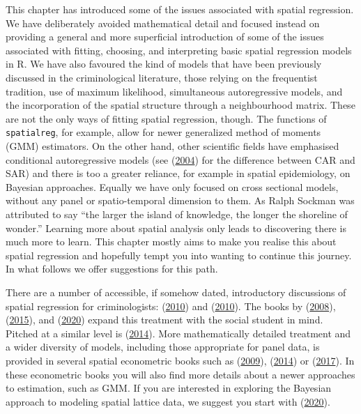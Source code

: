 \documentclass[
  krantz2]{krantz}
\begin{document}
This chapter has introduced some of the issues associated with spatial regression. We have deliberately avoided mathematical detail and focused instead on providing a general and more superficial introduction of some of the issues associated with fitting, choosing, and interpreting basic spatial regression models in R. We have also favoured the kind of models that have been previously discussed in the criminological literature, those relying on the frequentist tradition, use of maximum likelihood, simultaneous autoregressive models, and the incorporation of the spatial structure through a neighbourhood matrix. These are not the only ways of fitting spatial regression, though. The functions of \texttt{spatialreg}, for example, allow for newer generalized method of moments (GMM) estimators. On the other hand, other scientific fields have emphasised conditional autoregressive models (see (\protect\hyperlink{ref-Wall_2004}{2004}) for the difference between CAR and SAR) and there is too a greater reliance, for example in spatial epidemiology, on Bayesian approaches. Equally we have only focused on cross sectional models, without any panel or spatio-temporal dimension to them. As Ralph Sockman was attributed to say ``the larger the island of knowledge, the longer the shoreline of wonder.'' Learning more about spatial analysis only leads to discovering there is much more to learn. This chapter mostly aims to make you realise this about spatial regression and hopefully tempt you into wanting to continue this journey. In what follows we offer suggestions for this path.

There are a number of accessible, if somehow dated, introductory discussions of spatial regression for criminologists: (\protect\hyperlink{ref-Tita_2010}{2010}) and (\protect\hyperlink{ref-Bernasco_2010}{2010}). The books by (\protect\hyperlink{ref-Ward_2008}{2008}), (\protect\hyperlink{ref-Darmofal_2015}{2015}), and (\protect\hyperlink{ref-Chi_2020}{2020}) expand this treatment with the social student in mind. Pitched at a similar level is (\protect\hyperlink{ref-Anselin_2014}{2014}). More mathematically detailed treatment and a wider diversity of models, including those appropriate for panel data, is provided in several spatial econometric books such as (\protect\hyperlink{ref-LeSage_2009}{2009}), (\protect\hyperlink{ref-Elhorst_2014}{2014}) or (\protect\hyperlink{ref-Kelejian_2017}{2017}). In these econometric books you will also find more details about a newer approaches to estimation, such as GMM. If you are interested in exploring the Bayesian approach to modeling spatial lattice data, we suggest you start with (\protect\hyperlink{ref-Haining_2020}{2020}).
\end{document}
